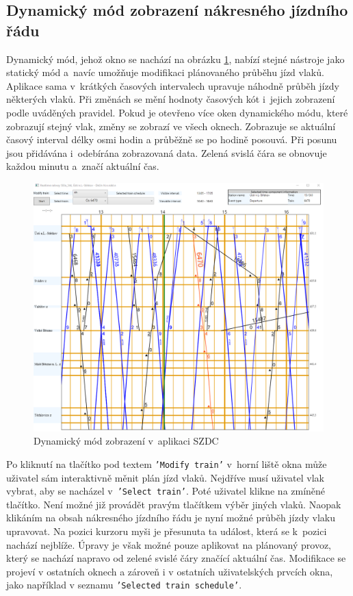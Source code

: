\subsection*{Dynamický mód zobrazení nákresného jízdního řádu}
Dynamický mód, jehož okno se nachází na obrázku \ref{fig:kap6:dynamic_schedule}, nabízí stejné nástroje jako statický mód a~navíc umožňuje modifikaci plánovaného průběhu jízd vlaků. Aplikace sama v~krátkých časových intervalech upravuje náhodně průběh jízdy některých vlaků. Při změnách se mění hodnoty časových kót i~jejich zobrazení podle uváděných pravidel. Pokud je otevřeno více oken dynamického módu, které zobrazují stejný vlak, změny se zobrazí ve všech oknech. Zobrazuje se aktuální časový interval délky osmi hodin a průběžně se po hodině posouvá. Při posunu jsou přidávána i~odebírána zobrazovaná data. Zelená svislá čára se obnovuje každou minutu a~značí aktuální čas.

\begin{figure}[!hbt]
	\includegraphics[width=\textwidth]{../img/kap6_dynamic_schedule}
	\caption{Dynamický mód zobrazení v~aplikaci SZDC}
	\label{fig:kap6:dynamic_schedule}
\end{figure}

Po kliknutí na tlačítko pod textem \texttt{'Modify train'} v~horní liště okna může uživatel sám interaktivně měnit plán jízd vlaků. Nejdříve musí uživatel vlak vybrat, aby se nacházel v~\texttt{'Select train'}. Poté uživatel klikne na zmíněné tlačítko. Není možné již provádět pravým tlačítkem výběr jiných vlaků. Naopak klikáním na obsah nákresného jízdního řádu je nyní možné průběh jízdy vlaku upravovat. Na pozici kurzoru myši je přesunuta ta událost, která se k~pozici nachází nejblíže. Úpravy je však možné pouze aplikovat na plánovaný provoz, který se nachází napravo od zelené svislé čáry značící aktuální čas. Modifikace se projeví v ostatních oknech a zároveň i v ostatních uživatelských prvcích okna, jako například v seznamu \texttt{'Selected train schedule'}.

